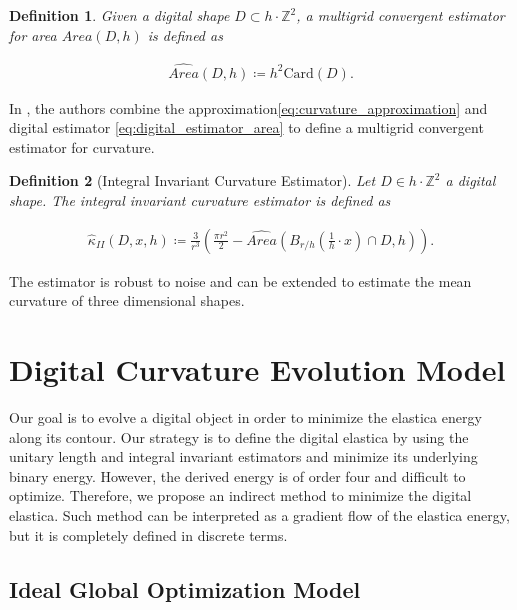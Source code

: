 \documentclass[runningheads]{llncs}
\newtheorem{ddef}{Definition}
\begin{document}
	\begin{ddef}	
		Given a digital shape $D \subset h \cdot \mathbb{Z}^2$, a multigrid convergent estimator for area $\widehat{Area}(D,h)$ is defined as	
		
		\begin{align}
			\widehat{Area}(D,h) \coloneqq h^2\text{Card}\left( D \right).			
			\label{eq:digital_estimator_area}
		\end{align}

	\end{ddef}
	
	In \cite{coeurjolly13}, the authors combine the approximation\eqref{eq:curvature_approximation} and digital estimator \eqref{eq:digital_estimator_area} to define a multigrid convergent estimator for curvature.

	\begin{ddef}[Integral Invariant Curvature Estimator]
		Let $D \in h \cdot \mathbb{Z}^2$ a digital shape. The integral invariant curvature estimator is defined as
		
		\begin{align*}
			\hat{\kappa}_{II}(D,x,h) \coloneqq \frac{3}{r^3} \left( \frac{\pi r^2}{2} - \widehat{Area} \left( B_{r/h} ( \frac{1}{h} \cdot x ) \cap D, h \right) \right).
		\end{align*}
	\end{ddef}
	

	The estimator is robust to noise and can be extended to estimate the mean curvature of three dimensional shapes.
	

\section{Digital Curvature Evolution Model}


Our goal is to evolve a digital object in order to minimize the elastica energy along its contour. Our strategy is to define the digital elastica by using the unitary length and integral invariant estimators and minimize its underlying binary energy. However, the derived energy is of order four and difficult to optimize. Therefore, we propose an indirect method to minimize the digital elastica. Such method can be interpreted as a gradient flow of the elastica energy, but it is completely defined in discrete terms.




\subsection{Ideal Global Optimization Model}
\end{document}
